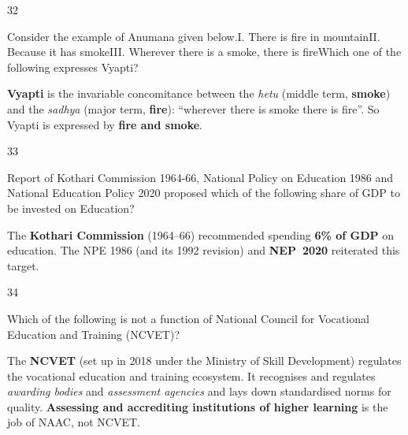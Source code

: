 \begin{question}{32}
{Consider the example of Anumana given below.\newline I. There is fire in mountain\newline II. Because it has smoke\newline III. Wherever there is a smoke, there is fire\newline Which one of the following expresses Vyapti?\par}
\begin{explain}
\textbf{Vyapti} is the invariable concomitance between the \emph{hetu} (middle term, \textbf{smoke}) and the \emph{sadhya} (major term, \textbf{fire}): ``wherever there is smoke there is fire''. So Vyapti is expressed by \textbf{fire and smoke}.
\end{explain}
\end{question}

\begin{question}{33}
{Report of Kothari Commission 1964-66, National Policy on Education 1986 and National Education Policy 2020 proposed which of the following share of GDP to be invested on Education?\par}
\begin{explain}
The \textbf{Kothari Commission} (1964--66) recommended spending \textbf{6\% of GDP} on education. The NPE 1986 (and its 1992 revision) and \textbf{NEP~2020} reiterated this target.
\end{explain}
\end{question}

\begin{question}{34}
{Which of the following is not a function of National Council for Vocational Education and Training (NCVET)?\par}
\begin{explain}
The \textbf{NCVET} (set up in 2018 under the Ministry of Skill Development) regulates the vocational education and training ecosystem. It recognises and regulates \emph{awarding bodies} and \emph{assessment agencies} and lays down standardised norms for quality. \textbf{Assessing and accrediting institutions of higher learning} is the job of NAAC, not NCVET.
\end{explain}
\end{question}

